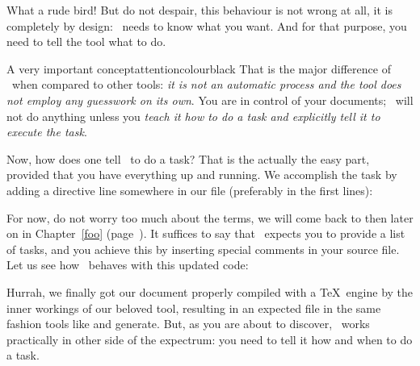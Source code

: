 What a rude bird! But do not despair, this behaviour is not wrong at all, it is completely by design: \arara\ needs to know what you want. And for that purpose, you need to tell the tool what to do.

\begin{messagebox}{A very important concept}{attentioncolour}{\icattention}{black}
That is the major difference of \arara\ when compared to other tools: \emph{it is not an automatic process and the tool does not employ any guesswork on its own}. You are in control of your documents; \arara\ will not do anything unless you \emph{teach it how to do a task and explicitly tell it to execute the task}.
\end{messagebox}

Now, how does one tell \arara\ to do a task? That is the actually the easy part, provided that you have everything up and running. We accomplish the task by adding a directive line somewhere in our  file (preferably in the first lines):


For now, do not worry too much about the terms, we will come back to then later on in Chapter~\ref{foo} (page~\pageref{foo}). It suffices to say that \arara\ expects you to provide a list of tasks, and you achieve this by inserting special comments in your source file. Let us see how \arara\ behaves with this updated code:


Hurrah, we finally got our document properly compiled with a \TeX\ engine by the inner workings of our beloved tool, resulting in an expected  file in the same fashion tools like  and  generate. But, as you are about to discover, \arara\ works practically in other side of the expectrum: you need to tell it how and when to do a task.

